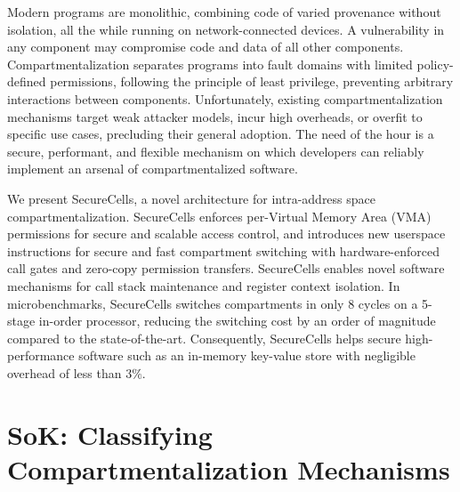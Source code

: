 \documentclass[lablogo]{thesis}
\begin{document}
Modern programs are monolithic, combining code of varied provenance without 
isolation, all the while running on network-connected devices. 
A vulnerability in any component may compromise code and data of all other 
components. 
Compartmentalization separates programs into fault domains with limited 
policy-defined permissions, following the principle of least privilege, 
preventing arbitrary interactions between components. 
Unfortunately, existing compartmentalization mechanisms target weak attacker 
models, incur high overheads, or overfit to specific use cases, precluding 
their general adoption. 
The need of the hour is a secure, performant, and flexible mechanism on which 
developers can reliably implement an arsenal of compartmentalized software. 

We present SecureCells, a novel architecture for intra-address space 
compartmentalization. 
SecureCells enforces per-Virtual Memory Area (VMA) permissions for secure and
scalable access control, and introduces new userspace instructions for 
secure and fast compartment switching with hardware-enforced call gates and 
zero-copy permission transfers. 
SecureCells enables novel software mechanisms for call stack maintenance and 
register context isolation. 
In microbenchmarks, SecureCells switches compartments in only 8 cycles on a 
5-stage in-order processor, reducing the switching cost by an order of magnitude
compared to the state-of-the-art. 
Consequently, SecureCells helps secure high-performance software such as an 
in-memory key-value store with negligible overhead of less than $3\%$.


\chapter{SoK: Classifying Compartmentalization Mechanisms}
\label{ch:compsok}
\end{document}
